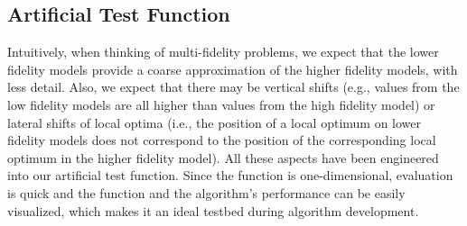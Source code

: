\subsection{Artificial Test Function}
Intuitively, when thinking of multi-fidelity problems, we expect that the lower fidelity models provide a coarse approximation of the higher fidelity models, with less detail. Also, we expect that there may be vertical shifts (e.g., values from the low fidelity models are all higher than values from the high fidelity model) or lateral shifts of local optima (i.e., the position of a local optimum on lower fidelity models does not correspond to the position of the corresponding local optimum in the higher fidelity model).
All these aspects have been engineered into our artificial test function. Since the function is one-dimensional, evaluation is quick and the function and the algorithm's performance can be easily visualized, which makes it an ideal testbed during algorithm development.

